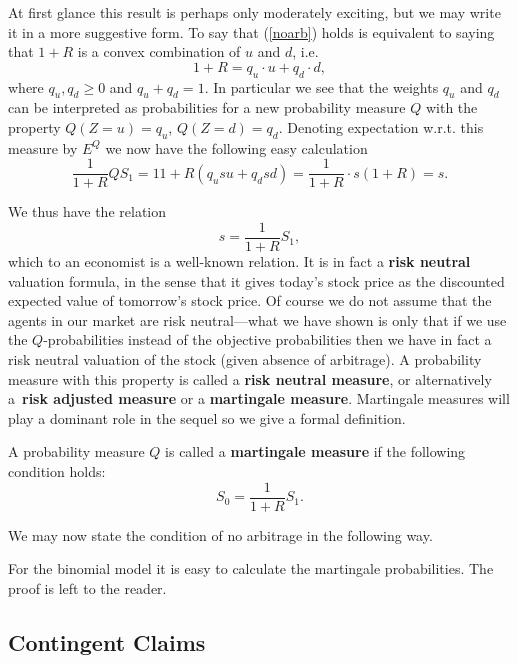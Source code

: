 \documentclass{Base}
\begin{document}
At first glance this result is perhaps only moderately exciting, but we may
write it in a more suggestive form. To say that (\ref{noarb}) holds is
equivalent to saying that $1+R$ is a convex combination of $u$ and $d$, i.e.
\begin{equation*}
1+R=q_u\cdot u+q_d\cdot d,
\end{equation*}
 where $q_u,q_d\geq 0$ and $q_u+q_d=1$. In particular we see that the weights
$q_u$ and $q_d$ can be interpreted as probabilities for a new probability
measure $Q$ with the property $Q(Z=u)=q_u$, $Q(Z=d)=q_d$. Denoting
expectation w.r.t. this measure by $E^Q$ we now have the following easy
calculation
\begin{equation*}
\frac 1{1+R} Q {S_1}=11+R(q_usu+q_dsd)=\frac 1{1+R}\cdot
 s(1+R)=s.
\end{equation*}

We thus have the relation
\begin{equation*}
s=\frac 1{1+R} S_1,
\end{equation*}
which to an economist is a well-known relation. It is in fact a {\bf risk
neutral} valuation formula, in the sense that
it gives today's stock price
as the discounted expected value of tomorrow's stock price. Of course
we do not assume that the agents in our market are risk neutral---what we
have shown is only that if we use the $Q$-probabilities instead of the
objective probabilities then we have in fact a risk neutral valuation of the
stock (given absence of arbitrage). A probability measure with this property
is called a {\bf risk neutral measure}, or alternatively a~{\bf risk adjusted measure} or a
{\bf martingale measure}. Martingale measures will play a dominant role in the
sequel so we give a formal definition.

\begin{definition}
A probability measure $Q$ is called a {\bf martingale measure}
if the
following condition holds:
\begin{equation*}
S_0=\frac{1}{1+R} S_1.
\end{equation*}
\end{definition}

We may now state the condition of no arbitrage in the following way.

For the binomial model it is easy to calculate the martingale probabilities.
The proof is left to the reader.

\subsection{Contingent Claims}
\label{bcc}
\end{document}

